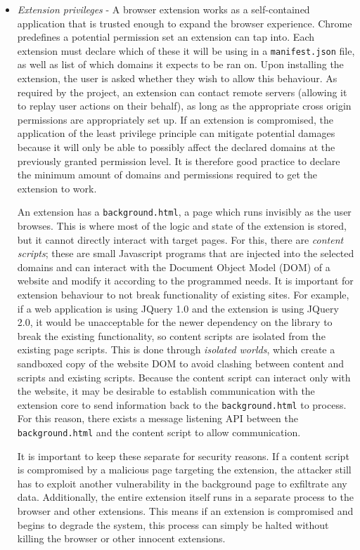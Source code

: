 \begin{itemize}
	\item \emph{Extension privileges} - A browser extension works as a self-contained application that is trusted enough to expand the browser experience. Chrome predefines a potential permission set an extension can tap into. Each extension must declare which of these it will be using in a \texttt{manifest.json} file, as well as list of which domains it expects to be ran on. Upon installing the extension, the user is asked whether they wish to allow this behaviour. As required by the project, an extension can contact remote servers (allowing it to replay user actions on their behalf), as long as the appropriate cross origin permissions are appropriately set up.
	If an extension is compromised, the application of the least privilege principle can mitigate potential damages because it will only be able to possibly affect the declared domains at the previously granted permission level. It is therefore good practice to declare the minimum amount of domains and permissions required to get the extension to work. 
	
	An extension has a \texttt{background.html}, a page which runs invisibly as the user browses. This is where most of the logic and state of the extension is stored, but it cannot directly interact with target pages. For this, there are \textit{content scripts}; these are small Javascript programs that are injected into the selected domains and can interact with the Document Object Model (DOM) of a website and modify it according to the programmed needs. It is important for extension behaviour to not break functionality of existing sites. For example, if a web application is using JQuery 1.0 and the extension is using JQuery 2.0, it would be unacceptable for the newer dependency on the library to break the existing functionality, so content scripts are isolated from the existing page scripts. This is done through \emph{isolated worlds}, which create a sandboxed copy of the website DOM to avoid clashing between content and scripts and existing scripts. Because the content script can interact only with the website, it may be desirable to establish communication with the extension core to send information back to the \texttt{background.html} to process. For this reason, there exists a message listening API between the \texttt{background.html} and the content script to allow communication. 
	
	It is important to keep these separate for security reasons. If a content script is compromised by a malicious page targeting the extension, the attacker still has to exploit another vulnerability in the background page to exfiltrate any data. Additionally, the entire extension itself runs in a separate process to the browser and other extensions. This means if an extension is compromised and begins to degrade the system, this process can simply be halted without killing the browser or other innocent extensions.
	

\end{itemize}
